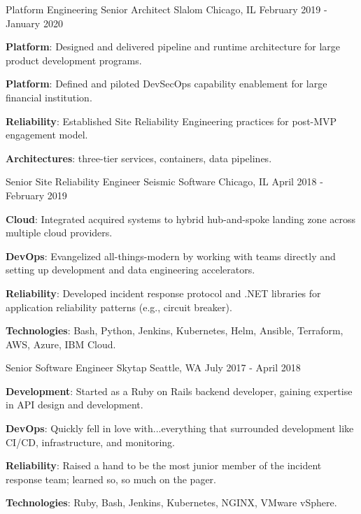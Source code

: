 \begin{cventries}
  \cventry
    {Platform Engineering Senior Architect} %
    {Slalom} %
    {Chicago, IL} %
    {February 2019 - January 2020} %
    {
      \begin{cvitems} %
        \item {\textbf{Platform}: Designed and delivered pipeline and runtime architecture for large product development programs.}
        \item {\textbf{Platform}: Defined and piloted DevSecOps capability enablement for large financial institution.}
        \item {\textbf{Reliability}: Established Site Reliability Engineering practices for post-MVP engagement model.}
        \item {\textbf{Architectures}: three-tier services, containers, data pipelines.}
      \end{cvitems}
    }

  \cventry
    {Senior Site Reliability Engineer} %
    {Seismic Software} %
    {Chicago, IL} %
    {April 2018 - February 2019} %
    {
      \begin{cvitems} %
        \item {\textbf{Cloud}: Integrated acquired systems to hybrid hub-and-spoke landing zone across multiple cloud providers.}
        \item {\textbf{DevOps}: Evangelized all-things-modern by working with teams directly and setting up development and data engineering accelerators.}
        \item {\textbf{Reliability}: Developed incident response protocol and .NET libraries for application reliability patterns (e.g., circuit breaker).}
        \item {\textbf{Technologies}: Bash, Python, Jenkins, Kubernetes, Helm, Ansible, Terraform, AWS, Azure, IBM Cloud.}
      \end{cvitems}
    }

  \cventry
    {Senior Software Engineer} %
    {Skytap} %
    {Seattle, WA} %
    {July 2017 - April 2018} %
    {
      \begin{cvitems} %
        \item {\textbf{Development}: Started as a Ruby on Rails backend developer, gaining expertise in API design and development.}
        \item {\textbf{DevOps}: Quickly fell in love with...everything that surrounded development like CI/CD, infrastructure, and monitoring.}
        \item {\textbf{Reliability}: Raised a hand to be the most junior member of the incident response team; learned so, so much on the pager.}
        \item {\textbf{Technologies}: Ruby, Bash, Jenkins, Kubernetes, NGINX, VMware vSphere.}
      \end{cvitems}
    }


\end{cventries}
